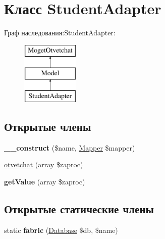 \hypertarget{classStudentAdapter}{}\section{Класс Student\+Adapter}
\label{classStudentAdapter}
Граф наследования\+:Student\+Adapter\+:\begin{figure}[H]
\begin{center}
\leavevmode
\includegraphics[height=3.000000cm]{classStudentAdapter}
\end{center}
\end{figure}
\subsection*{Открытые члены}
\begin{DoxyCompactItemize}
\item 
\hypertarget{classStudentAdapter_ae6560cbd781b9e517aa49c0e21094f06}{}{\bfseries \+\_\+\+\_\+construct} (\$name, \hyperlink{classMapper}{Mapper} \$mapper)\label{classStudentAdapter_ae6560cbd781b9e517aa49c0e21094f06}

\item 
\hyperlink{classStudentAdapter_a3bef77fa5ced3e0c7fa7f79cc958c41e}{otvetchat} (array \$zaproc)
\item 
\hypertarget{classStudentAdapter_a0fd80b842054b227cdd14f5fd368ef70}{}{\bfseries get\+Value} (array \$zaproc)\label{classStudentAdapter_a0fd80b842054b227cdd14f5fd368ef70}

\end{DoxyCompactItemize}
\subsection*{Открытые статические члены}
\begin{DoxyCompactItemize}
\item 
\hypertarget{classStudentAdapter_abe36356a6d7e1d90ecb6b084c59dd8a7}{}static {\bfseries fabric} (\hyperlink{classDatabase}{Database} \$db, \$name)\label{classStudentAdapter_abe36356a6d7e1d90ecb6b084c59dd8a7}

\end{DoxyCompactItemize}


